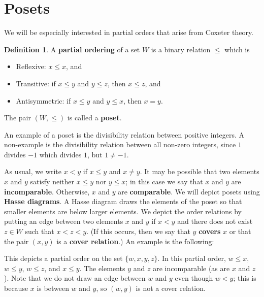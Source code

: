\documentclass{article}
\numberwithin{equation}{section}
\newcommand{\newword}[1]{\textbf{#1}}
\theoremstyle{remark}
\theoremstyle{definition}
\newtheorem{definition}[theorem]{Definition}
\begin{document}
	\section{Posets}
	We will be especially interested in partial orders that arise from Coxeter theory. 
	\begin{definition}
		A \newword{partial ordering} of a set $W$ is a binary relation $\leq$ which is 
		\begin{itemize}
			\item Reflexive: $x\leq x$, and
			\item Transitive: if $x \leq y$ and $y\leq z$, then $x\leq z$, and
			\item Antisymmetric: if $x \leq y$ and $y\leq x$, then $x=y$.
		\end{itemize}
		The pair $(W,\leq)$ is called a \newword{poset}.
	\end{definition}
	
	An example of a poset is the divisibility relation between positive integers. A non-example is the divisibility relation between all non-zero integers, since $1$ divides $-1$ which divides $1$, but $1\neq -1$.
	
	As usual, we write $x<y$ if $x\leq y$ and $x\neq y$. It may be possible that two elements $x$ and $y$ satisfy neither $x\leq y$ nor $y\leq x$; in this case we say that $x$ and $y$ are \newword{incomparable}. Otherwise, $x$ and $y$ are \newword{comparable}. We will depict posets using \newword{Hasse diagrams}. A Hasse diagram draws the elements of the poset so that smaller elements are below larger elements. We depict the order relations by putting an edge between two elements $x$ and $y$ if $x<y$ and there does not exist $z\in W$ such that $x<z<y$. (If this occurs, then we say that $y$ \newword{covers} $x$ or that the pair $(x,y)$ is a \newword{cover relation}.) An example is the following:
	\begin{center}
	\end{center}
	This depicts a partial order on the set $\{w,x,y,z\}$. In this partial order, $w\leq x$, $w\leq y$, $w\leq z$, and $x\leq y$. The elements $y$ and $z$ are incomparable (as are $x$ and $z$). Note that we do not draw an edge between $w$ and $y$ even though $w < y$; this is because $x$ is between $w$ and $y$, so $(w,y)$ is not a cover relation.
	
\end{document}
